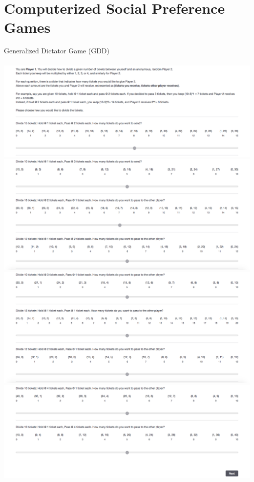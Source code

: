 \documentclass[12pt]{article}
\begin{document}
{\section{Computerized Social Preference Games} \label{app:a} 
\vspace{8mm} 
\noindent Generalized Dictator Game (GDD) \\ \\
\includegraphics[scale=0.35]{gendict1}\\
\includegraphics[scale=0.35]{gendict2}\\
\includegraphics[scale=0.35]{gendict3}\\
\includegraphics[scale=0.35]{gendict4}\\ \\
}
\end{document}
